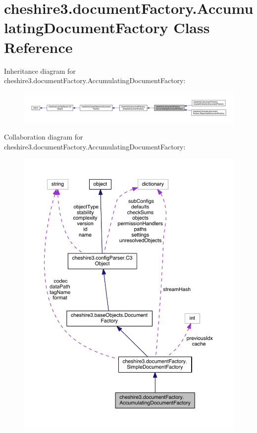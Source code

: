 \hypertarget{classcheshire3_1_1document_factory_1_1_accumulating_document_factory}{\section{cheshire3.\-document\-Factory.\-Accumulating\-Document\-Factory Class Reference}
\label{classcheshire3_1_1document_factory_1_1_accumulating_document_factory}
}


Inheritance diagram for cheshire3.\-document\-Factory.\-Accumulating\-Document\-Factory\-:
\nopagebreak
\begin{figure}[H]
\begin{center}
\leavevmode
\includegraphics[width=350pt]{classcheshire3_1_1document_factory_1_1_accumulating_document_factory__inherit__graph}
\end{center}
\end{figure}


Collaboration diagram for cheshire3.\-document\-Factory.\-Accumulating\-Document\-Factory\-:
\nopagebreak
\begin{figure}[H]
\begin{center}
\leavevmode
\includegraphics[width=350pt]{classcheshire3_1_1document_factory_1_1_accumulating_document_factory__coll__graph}
\end{center}
\end{figure}
